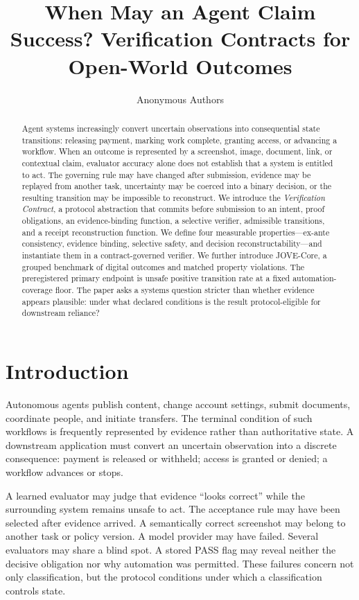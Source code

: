 \documentclass[sigconf,anonymous,review]{acmart}
\title{When May an Agent Claim Success? Verification Contracts for Open-World Outcomes}
\author{Anonymous Authors}
\begin{document}
\begin{abstract}
Agent systems increasingly convert uncertain observations into consequential state transitions: releasing payment, marking work complete, granting access, or advancing a workflow. When an outcome is represented by a screenshot, image, document, link, or contextual claim, evaluator accuracy alone does not establish that a system is entitled to act. The governing rule may have changed after submission, evidence may be replayed from another task, uncertainty may be coerced into a binary decision, or the resulting transition may be impossible to reconstruct. We introduce the \emph{Verification Contract}, a protocol abstraction that commits before submission to an intent, proof obligations, an evidence-binding function, a selective verifier, admissible transitions, and a receipt reconstruction function. We define four measurable properties---ex-ante consistency, evidence binding, selective safety, and decision reconstructability---and instantiate them in a contract-governed verifier. We further introduce JOVE-Core, a grouped benchmark of digital outcomes and matched property violations. The preregistered primary endpoint is unsafe positive transition rate at a fixed automation-coverage floor. The paper asks a systems question stricter than whether evidence appears plausible: under what declared conditions is the result protocol-eligible for downstream reliance?
\end{abstract}
\maketitle

\section{Introduction}
Autonomous agents publish content, change account settings, submit documents, coordinate people, and initiate transfers. The terminal condition of such workflows is frequently represented by evidence rather than authoritative state. A downstream application must convert an uncertain observation into a discrete consequence: payment is released or withheld; access is granted or denied; a workflow advances or stops.

A learned evaluator may judge that evidence ``looks correct'' while the surrounding system remains unsafe to act. The acceptance rule may have been selected after evidence arrived. A semantically correct screenshot may belong to another task or policy version. A model provider may have failed. Several evaluators may share a blind spot. A stored PASS flag may reveal neither the decisive obligation nor why automation was permitted. These failures concern not only classification, but the protocol conditions under which a classification controls state.
\end{document}
